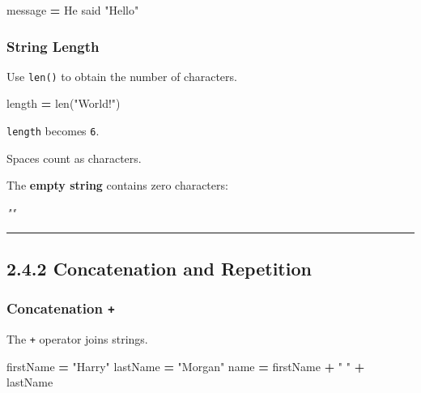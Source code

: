 \documentclass[
]{article}
\newenvironment{Shaded}{\begin{snugshade}}{\end{snugshade}}
\newcommand{\BuiltInTok}[1]{#1}
\newcommand{\CommentTok}[1]{\textcolor[rgb]{0.56,0.35,0.01}{\textit{#1}}}
\newcommand{\NormalTok}[1]{#1}
\newcommand{\OperatorTok}[1]{\textcolor[rgb]{0.81,0.36,0.00}{\textbf{#1}}}
\newcommand{\StringTok}[1]{\textcolor[rgb]{0.31,0.60,0.02}{#1}}
\begin{document}
\begin{Shaded}
\begin{Highlighting}[]
\NormalTok{message }\OperatorTok{=} \StringTok{\textquotesingle{}He said "Hello"\textquotesingle{}}
\end{Highlighting}
\end{Shaded}

\subsubsection{String Length}\label{string-length}

Use \texttt{len()} to obtain the number of characters.

\begin{Shaded}
\begin{Highlighting}[]
\NormalTok{length }\OperatorTok{=} \BuiltInTok{len}\NormalTok{(}\StringTok{"World!"}\NormalTok{)}
\end{Highlighting}
\end{Shaded}

\texttt{length} becomes \texttt{6}.

Spaces count as characters.

The \textbf{empty string} contains zero characters:

\begin{Shaded}
\begin{Highlighting}[]
\CommentTok{""}
\CommentTok{\textquotesingle{}\textquotesingle{}}
\end{Highlighting}
\end{Shaded}

\begin{center}\rule{0.5\linewidth}{0.5pt}\end{center}

\subsection{2.4.2 Concatenation and
Repetition}\label{concatenation-and-repetition}

\subsubsection{\texorpdfstring{Concatenation
\texttt{+}}{Concatenation +}}\label{concatenation}

The \texttt{+} operator joins strings.

\begin{Shaded}
\begin{Highlighting}[]
\NormalTok{firstName }\OperatorTok{=} \StringTok{"Harry"}
\NormalTok{lastName }\OperatorTok{=} \StringTok{"Morgan"}
\NormalTok{name }\OperatorTok{=}\NormalTok{ firstName }\OperatorTok{+} \StringTok{" "} \OperatorTok{+}\NormalTok{ lastName}
\end{Highlighting}
\end{Shaded}
\end{document}
